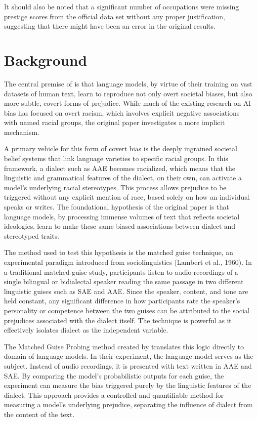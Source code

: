 \documentclass[11pt]{article}
\begin{document}
It should also be noted that a significant number of occupations were missing prestige scores from the official data set without any proper justification, suggesting that there might have been an error in the original results.

\section{Background}

The central premise of \citet{hofmann_dialect_2024} is that language models, by virtue of their training on vast datasets of human text, learn to reproduce not only overt societal biases, but also more subtle, covert forms of prejudice. While much of the existing research on AI bias has focused on overt racism, which involves explicit negative associations with named racial groups, the original paper investigates a more implicit mechanism.

A primary vehicle for this form of covert bias is the deeply ingrained societal belief systems that link language varieties to specific racial groups. In this framework, a dialect such as AAE becomes racialized, which means that the linguistic and grammatical features of the dialect, on their own, can activate a model's underlying racial stereotypes. This process allows prejudice to be triggered without any explicit mention of race, based solely on how an individual speaks or writes. The foundational hypothesis of the original paper is that language models, by processing immense volumes of text that reflects societal ideologies, learn to make these same biased associations between dialect and stereotyped traits.

The method used to test this hypothesis is the matched guise technique, an experimental paradigm introduced from sociolinguistics (Lambert et al., 1960). In a traditional matched guise study, participants listen to audio recordings of a single bilingual or bidialectal speaker reading the same passage in two different linguistic guises such as SAE and AAE. Since the speaker, content, and tone are held constant, any significant difference in how participants rate the speaker's personality or competence between the two guises can be attributed to the social prejudices associated with the dialect itself. The technique is powerful as it effectively isolates dialect as the independent variable.

The Matched Guise Probing method created by \citet{hofmann_dialect_2024} translates this logic directly to domain of language models. In their experiment, the language model serves as the subject. Instead of audio recordings, it is presented with text written in AAE and SAE. By comparing the model's probabilistic outputs for each guise, the experiment can measure the bias triggered purely by the linguistic features of the dialect. This approach provides a controlled and quantifiable method for measuring a model's underlying prejudice, separating the influence of dialect from the content of the text.
\end{document}
